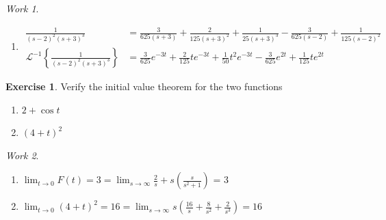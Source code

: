 \documentclass{report}
\theoremstyle{definition}
\newtheorem{exercise}{Exercise}[chapter]
\theoremstyle{remark}
\newtheorem*{work}{Work}
\newcommand{\inlt}[1]{\mathscr{L}^{-1} \left\{ #1 \right\}}
\begin{document}
\begin{work}
\begin{enumerate}[label = (\alph*)]
\begin{equation*}
\begin{split}
                \frac{1}{s(s+3)^2} &= \frac{1}{9s}-\frac{1}{9(s+3)} - \frac{1}{3(s+3)^2} \\
                \inlt{\frac{1}{9s}-\frac{1}{9(s+3)} - \frac{1}{3(s+3)^2}} &= \frac{1}{9}-\frac{1}{9}e^{-3t}-\frac{1}{3}e^{-3t}t
            \end{split}
        \end{equation*}
        \item \begin{equation*}
            \begin{split}
                \frac{1}{(s-2)^2(s+3)^3} &= \frac{3}{625(s+3)} + \frac{2}{125(s+3)^2} + \frac{1}{25(s+3)^3} -\frac{3}{625(s-2)}+\frac{1}{125(s-2)^2}\\
                \inlt{\frac{1}{(s-2)^2(s+3)^3}} &= \frac{3}{625}e^{-3t}+\frac{2}{125}te^{-3t}+\frac{1}{50}t^2e^{-3t} - \frac{3}{625}e^{2t}+\frac{1}{125}te^{2t}
            \end{split}
        \end{equation*}
    \end{enumerate}
\end{work}

\begin{exercise}
    Verify the initial value theorem for the two functions 
    \begin{enumerate}[label = (\alph*)]
        \item $2+\cos t$
        \item $(4+t)^2$
    \end{enumerate}
\end{exercise}
\begin{work}
\leavevmode
    \begin{enumerate}[label = (\alph*)]
        \item $\displaystyle{\lim_{t\rightarrow 0}} F(t) = 3 = \lim_{s\rightarrow \infty} \frac{2}{s} + s\left(\frac{s}{s^2+1}\right)$ = 3
        \item $\displaystyle{\lim_{t\rightarrow 0}} (4+t)^2=16= \lim_{s\rightarrow \infty}s\left(\frac{16}{s} + \frac{8}{s^2} + \frac{2}{s^3} \right) = 16$
    \end{enumerate}
\end{work}
\end{document}
